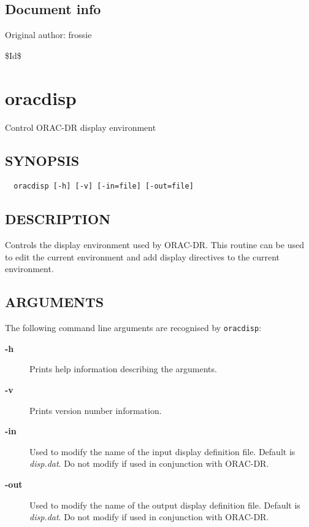 \documentclass[twoside,11pt]{article}
\renewcommand{\_}{\texttt{\symbol{95}}}
\begin{document}
\subsection*{Document info\label{Shell_Variables_Document_info}}


Original author: frossie



\$Id\$


\section{oracdisp\label{oracdisp}}


Control ORAC-DR display environment

\subsection*{SYNOPSIS\label{oracdisp_SYNOPSIS}}
\begin{verbatim}
  oracdisp [-h] [-v] [-in=file] [-out=file]
\end{verbatim}
\subsection*{DESCRIPTION\label{oracdisp_DESCRIPTION}}


Controls the display environment used by ORAC-DR. This routine
can be used to edit the current environment and add display directives
to the current environment.

\subsection*{ARGUMENTS\label{oracdisp_ARGUMENTS}}


The following command line arguments are recognised by \texttt{oracdisp}:

\begin{description}

\item[{\textbf{-h}}] \mbox{}

Prints help information describing the arguments.


\item[{\textbf{-v}}] \mbox{}

Prints version number information.


\item[{\textbf{-in}}] \mbox{}

Used to modify the name of the input display definition file.
Default is \emph{disp.dat}. Do not modify if used in conjunction with
ORAC-DR.


\item[{\textbf{-out}}] \mbox{}

Used to modify the name of the output display definition file.
Default is \emph{disp.dat}. Do not modify if used in conjunction with
ORAC-DR.

\end{description}
\end{document}

